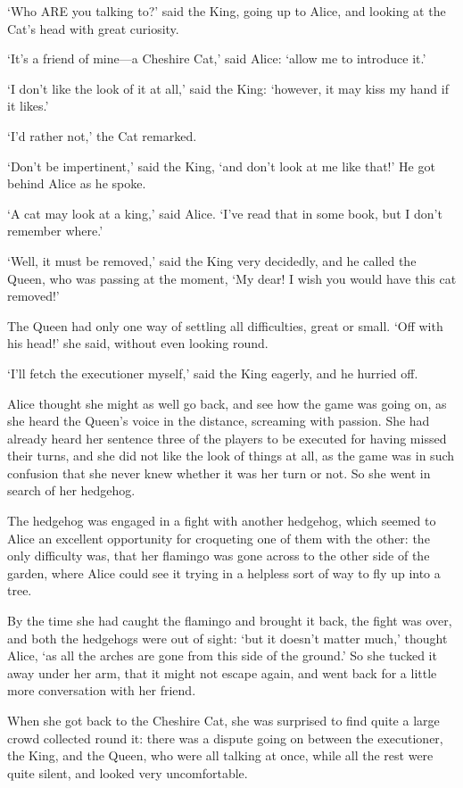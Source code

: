 \documentclass[12pt]{article}
\begin{document}
\begin{Parallel}[p]{}{}
{‘Who ARE you talking to?’ said the King, going up to Alice, and looking at the Cat’s head with great curiosity.

‘It’s a friend of mine—a Cheshire Cat,’ said Alice: ‘allow me to introduce it.’

‘I don’t like the look of it at all,’ said the King: ‘however, it may kiss my hand if it likes.’

‘I’d rather not,’ the Cat remarked.

‘Don’t be impertinent,’ said the King, ‘and don’t look at me like that!’ He got behind Alice as he spoke.

‘A cat may look at a king,’ said Alice. ‘I’ve read that in some book, but I don’t remember where.’

‘Well, it must be removed,’ said the King very decidedly, and he called the Queen, who was passing at the moment, ‘My dear! I wish you would have this cat removed!’

The Queen had only one way of settling all difficulties, great or small. ‘Off with his head!’ she said, without even looking round.

‘I’ll fetch the executioner myself,’ said the King eagerly, and he hurried off.

Alice thought she might as well go back, and see how the game was going on, as she heard the Queen’s voice in the distance, screaming with passion. She had already heard her sentence three of the players to be executed for having missed their turns, and she did not like the look of things at all, as the game was in such confusion that she never knew whether it was her turn or not. So she went in search of her hedgehog.

The hedgehog was engaged in a fight with another hedgehog, which seemed to Alice an excellent opportunity for croqueting one of them with the other: the only difficulty was, that her flamingo was gone across to the other side of the garden, where Alice could see it trying in a helpless sort of way to fly up into a tree.

By the time she had caught the flamingo and brought it back, the fight was over, and both the hedgehogs were out of sight: ‘but it doesn’t matter much,’ thought Alice, ‘as all the arches are gone from this side of the ground.’ So she tucked it away under her arm, that it might not escape again, and went back for a little more conversation with her friend.

When she got back to the Cheshire Cat, she was surprised to find quite a large crowd collected round it: there was a dispute going on between the executioner, the King, and the Queen, who were all talking at once, while all the rest were quite silent, and looked very uncomfortable.

}
\end{Parallel}
\end{document}
